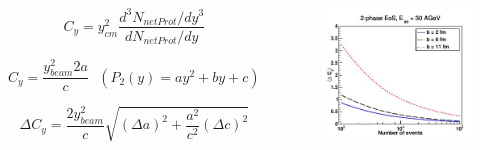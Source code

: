\documentclass[dvipsnames] {beamer}
\begin{document}
\begin{frame}[shrink=35]
\begin{columns}[c]
    \begin{block}{}
     
      $$C_{y} = y_{cm}^{2} \dfrac{d^{3}N_{netProt} / dy^{3}}{dN_{netProt} / dy}$$
        
       $$ C_{y} = \dfrac{y^{2}_{beam} 2a}{c} ~~~ (P_{2}(y) = ay^{2} + by + c) $$
        
       $$ \Delta C_{y} = \dfrac{2 y^{2}_{beam}}{c}\sqrt{(\Delta a)^{2} + \dfrac{a^{2}}{c^{2}} (\Delta c)^{2}}$$
    
    \end{block}
    
    \begin{block}{}
       \begin{figure}[H]
         \includegraphics[width=.9\textwidth]{Cy_errorDistrib.jpg}
       \end{figure}
    \end{block}
  \end{columns} 
\end{frame}
\end{document}
